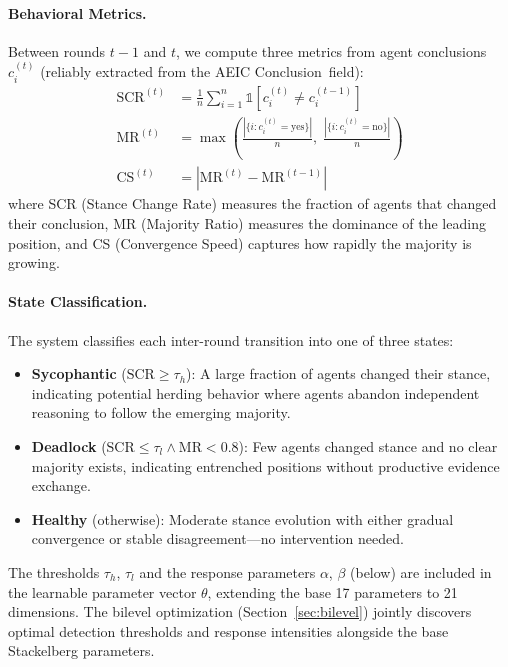 \paragraph{Behavioral Metrics.}
Between rounds $t{-}1$ and $t$, we compute three metrics from agent conclusions $c_i^{(t)}$ (reliably extracted from the AEIC Conclusion~field):
\begin{align}
    \text{SCR}^{(t)} &= \frac{1}{n}\sum_{i=1}^{n} \mathbb{1}\!\left[c_i^{(t)} \neq c_i^{(t-1)}\right] \label{eq:scr} \\
    \text{MR}^{(t)} &= \max\!\left(\frac{|\{i : c_i^{(t)} = \text{yes}\}|}{n},\; \frac{|\{i : c_i^{(t)} = \text{no}\}|}{n}\right) \label{eq:mr} \\
    \text{CS}^{(t)} &= \left|\text{MR}^{(t)} - \text{MR}^{(t-1)}\right| \label{eq:cs}
\end{align}
where SCR (Stance Change Rate) measures the fraction of agents that changed their conclusion, MR (Majority Ratio) measures the dominance of the leading position, and CS (Convergence Speed) captures how rapidly the majority is growing.

\paragraph{State Classification.}
The system classifies each inter-round transition into one of three states:
\begin{itemize}
    \item \textbf{Sycophantic} ($\text{SCR} \geq \tau_h$): A large fraction of agents changed their stance, indicating potential herding behavior where agents abandon independent reasoning to follow the emerging majority.
    \item \textbf{Deadlock} ($\text{SCR} \leq \tau_l \wedge \text{MR} < 0.8$): Few agents changed stance and no clear majority exists, indicating entrenched positions without productive evidence exchange.
    \item \textbf{Healthy} (otherwise): Moderate stance evolution with either gradual convergence or stable disagreement---no intervention needed.
\end{itemize}
The thresholds $\tau_h$, $\tau_l$ and the response parameters $\alpha$, $\beta$ (below) are included in the learnable parameter vector $\theta$, extending the base 17 parameters to 21 dimensions. The bilevel optimization (Section~\ref{sec:bilevel}) jointly discovers optimal detection thresholds and response intensities alongside the base Stackelberg parameters.

